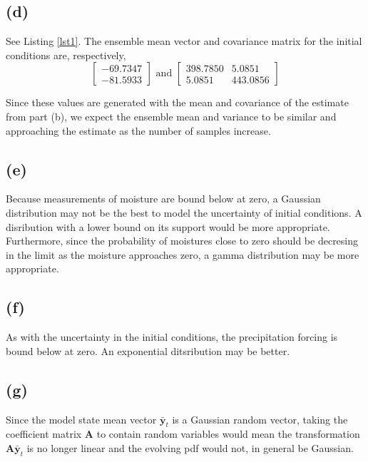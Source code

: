 \documentclass[fleqn, letterpaper]{tufte-handout}
\begin{document}
\subsection{(d)}
See Listing \ref{lst1}. The ensemble mean vector and covariance matrix for the initial conditions are, respectively, 
\[
        \begin{bmatrix}
                -69.7347 \\
                -81.5933
        \end{bmatrix}
        \text{ and }
        \begin{bmatrix}
                398.7850 & 5.0851 \\
                5.0851 & 443.0856
        \end{bmatrix}
\]

Since these values are generated with the mean and covariance of the estimate from part (b), we expect the ensemble mean and variance to be similar and approaching the estimate as the number of samples increase.

\subsection{(e)}

Because measurements of moisture are bound below at zero, a Gaussian distribution may not be the best to model the uncertainty of initial conditions. A disribution with a lower bound on its support would be more appropriate. Furthermore, since the probability of moistures close to zero should be decresing in the limit as the moisture approaches zero, a gamma distribution may be more appropriate.

\subsection{(f)}

As with the uncertainty in the initial conditions, the precipitation forcing is bound below at zero. An exponential ditsribution may be better. 

\subsection{(g)}

Since the model state mean vector $\bar{\mathbf{y}}_t$ is a Gaussian random vector, taking the coefficient matrix $\mathbf{A}$ to contain random variables would mean the transformation $\mathbf{A}\bar{\mathbf{y}}_t$ is no longer linear and the evolving pdf would not, in general be Gaussian.
\end{document}
